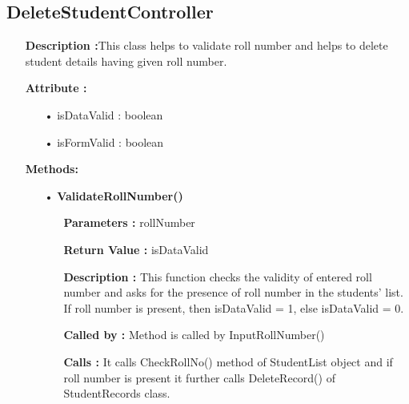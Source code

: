 \documentclass{scrreprt}
\begin{document}
\subsection{DeleteStudentController}
\begin{enumerate}
\item[] \textbf{Description :}This class helps to validate roll number and helps to delete student details having given roll number.
\item[] \textbf{Attribute :} 
\begin{itemize}
\item [•] isDataValid : boolean
\item [•] isFormValid : boolean
\end{itemize}
\item [] \textbf{Methods:}
\begin{itemize}
\item [•] \textbf{ValidateRollNumber()}
\begin{itemize}
\item [] \textbf{Parameters :} rollNumber
\item [] \textbf{Return Value :} isDataValid
\item [] \textbf{Description :} This function checks the validity of entered roll number and asks for the presence of roll number in the students' list. If roll number is present, then isDataValid = 1, else isDataValid = 0.
\item [] \textbf{Called by :} Method is called by InputRollNumber()
\item [] \textbf{Calls :} It calls CheckRollNo() method of StudentList object and if roll number is present it further calls DeleteRecord() of StudentRecords class.
\end{itemize}
\end{itemize}
\end{enumerate}
\end{document}
